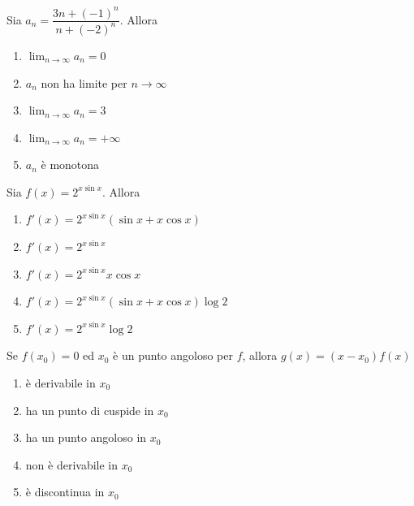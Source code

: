 \begin{quiz}
Sia $a_n=\dfrac{3n+(-1)^n}{n+(-2)^n}$. Allora
\begin{enumerate}
\item $\lim_{n\to\infty}a_n=0$
\item $a_n$ non ha limite per $n\to\infty$
\item $\lim_{n\to\infty}a_n=3$
\item $\lim_{n\to\infty}a_n=+\infty$
\item $a_n$ \`e monotona
\end{enumerate}
\end{quiz}

\begin{quiz}
Sia $f(x)=2^{x\sin x}$. Allora
\begin{enumerate}
\item $f'(x)=2^{x\sin x}(\sin x+x\cos x)$
\item $f'(x)=2^{x\sin x}$
\item $f'(x)=2^{x\sin x}x\cos x$
\item $f'(x)=2^{x\sin x}(\sin x+x\cos x)\log2$
\item $f'(x)=2^{x\sin x}\log2$
\end{enumerate}
\end{quiz}

\begin{quiz}
Se $f(x_0)=0$ ed $x_0$ \`e un punto angoloso per $f$, allora $g(x)=(x-x_0)f(x)$
\begin{enumerate}
\item \`e derivabile in $x_0$
\item ha un punto di cuspide in $x_0$
\item ha un punto angoloso in $x_0$
\item non \`e derivabile in $x_0$
\item \`e discontinua in $x_0$
\end{enumerate}
\end{quiz}

